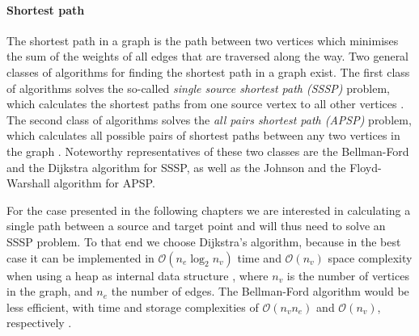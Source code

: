 \paragraph{Shortest path}
The shortest path in a graph is the path between two vertices which minimises the sum of the weights
of all edges that are traversed along the way.
Two general classes of algorithms for finding the shortest path in a graph exist.
The first class of algorithms solves the so-called \textit{single source shortest path (SSSP)} problem,
which calculates the shortest paths from one source vertex to all other vertices \cite[pp. 273-297]{Erickson2019}.
The second class of algorithms solves the \textit{all pairs shortest path (APSP)} problem, which calculates
all possible pairs of shortest paths between any two vertices in the graph \cite[pp. 309-320]{Erickson2019}.
Noteworthy representatives of these two classes are the Bellman-Ford \cite[Ch. 4.2.2, pp. 11-14]{FUH_algo_graphs_2021}
and the Dijkstra algorithm \cite[Ch. 4.2.3, pp. 14-18]{FUH_algo_graphs_2021} for SSSP,
as well as the Johnson \cite[Ch. 4.3.1, pp. 19-21]{FUH_algo_graphs_2021}
and the Floyd-Warshall algorithm \cite[Ch. 4.3.2, pp. 21-24]{FUH_algo_graphs_2021} for APSP.

For the case presented in the following chapters we are interested in calculating a single path between 
a source and target point and will thus need to solve an SSSP problem.
To that end we choose Dijkstra's algorithm, because in the best case it can be implemented 
in $\mathcal{O}\left( n_e \log_2 n_v \right)$ time and $\mathcal{O}\left( n_v \right)$ space 
complexity when using a heap as internal data structure \cite[pp. 17-18]{FUH_algo_graphs_2021}, 
where $n_v$ is the number of vertices in the graph, and $n_e$ the number of edges.
The Bellman-Ford algorithm would be less efficient, with time and storage complexities of 
$\mathcal{O}\left( n_v n_e \right)$ and $\mathcal{O}\left( n_v \right)$, respectively 
\cite[p. 13]{FUH_algo_graphs_2021}.

